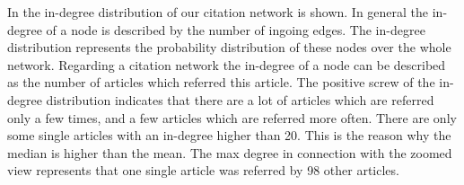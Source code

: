 In  the in-degree distribution of our citation network is shown. In general the in-degree of a node is described by the number of ingoing edges. The in-degree distribution represents the probability distribution of these nodes over the whole network. Regarding a citation network the in-degree of a node can be described as the number of articles which referred this article. The positive screw of the in-degree distribution indicates that there are a lot of articles which are referred only a few times, and a few articles which are referred more often. There are only some single articles with an in-degree higher than 20. This is the reason why the median is higher than the mean. The max degree in connection with the zoomed view represents that one single article was referred by 98 other articles.


